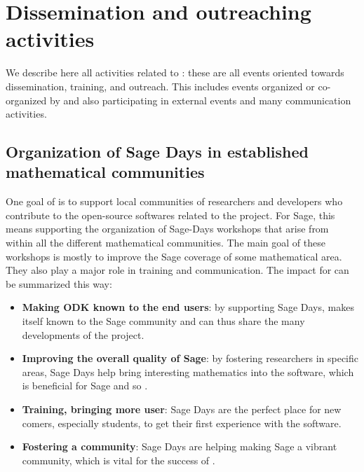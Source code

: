 \documentclass{deliverablereport}
\begin{document}

\newpage






%







\clearpage

\section{Dissemination and outreaching activities}

We describe here all activities related to :
these are all events oriented towards dissemination, training, and outreach. This
includes events organized or co-organized by \ODK and also
participating in external events and many communication activities.

\subsection{Organization of Sage Days in established mathematical communities}

One goal of \ODK is to support local communities of researchers
and developers who contribute to the open-source softwares related to
the project. For Sage, this means supporting the organization of Sage-Days
workshops that arise from within all the different mathematical communities. The main 
goal of these workshops is mostly to improve the Sage coverage of some mathematical
area. They also play a major role in training and communication. The
impact for \ODK can be summarized this way:

\begin{itemize}
\item \textbf{Making ODK known to the end users}: by supporting Sage Days,
\ODK makes itself known to the Sage community and can
thus share the many developments of the project.

\item \textbf{Improving the overall quality of Sage}: by fostering researchers
in specific areas, Sage Days help bring interesting mathematics into
the software, which is beneficial for Sage and so \ODK.

\item \textbf{Training, bringing more user}: Sage Days are the perfect place
for new comers, especially students, to get their first experience with the software.

\item \textbf{Fostering a community}: Sage Days are helping making Sage a vibrant
community, which is vital for the success of \ODK.
\end{itemize}
\end{document}
